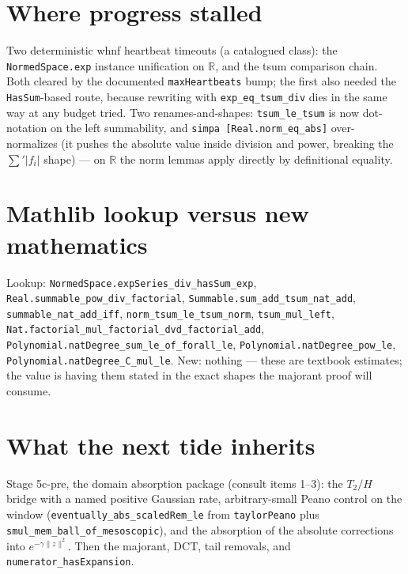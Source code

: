 \documentclass[11pt]{article}
\newcommand{\R}{\mathbb{R}}
\newcommand{\code}[1]{\texttt{#1}}
\begin{document}
\section{Where progress stalled}

Two deterministic whnf heartbeat timeouts (a catalogued class): the
\code{NormedSpace.exp} instance unification on $\R$, and the tsum
comparison chain. Both cleared by the documented
\code{maxHeartbeats} bump; the first also needed the
\code{HasSum}-based route, because rewriting with
\code{exp\_eq\_tsum\_div} dies in the same way at any budget tried.
Two renames-and-shapes: \code{tsum\_le\_tsum} is now dot-notation on
the left summability, and \code{simpa [Real.norm\_eq\_abs]}
over-normalizes (it pushes the absolute value inside division and
power, breaking the $\sum' |f_i|$ shape) --- on $\R$ the norm lemmas
apply directly by definitional equality.

\section{Mathlib lookup versus new mathematics}

\begin{sloppypar}
Lookup: \code{NormedSpace.expSeries\_div\_hasSum\_exp},
\code{Real.summable\_pow\_div\_factorial},
\code{Summable.sum\_add\_tsum\_nat\_add},
\code{summable\_nat\_add\_iff}, \code{norm\_tsum\_le\_tsum\_norm},
\code{tsum\_mul\_left},
\code{Nat.factorial\_mul\_factorial\_dvd\_factorial\_add},
\code{Polynomial.natDegree\_sum\_le\_of\_forall\_le},
\code{Polynomial.natDegree\_pow\_le},
\code{Polynomial.natDegree\_C\_mul\_le}. New: nothing --- these are
textbook estimates; the value is having them stated in the exact
shapes the majorant proof will consume.
\end{sloppypar}

\section{What the next tide inherits}

Stage 5c-pre, the domain absorption package (consult items 1--3):
the $T_2/H$ bridge with a named positive Gaussian rate,
arbitrary-small Peano control on the window
(\code{eventually\_abs\_scaledRem\_le} from \code{taylorPeano} plus
\code{smul\_mem\_ball\_of\_mesoscopic}), and the absorption of the
absolute corrections into $e^{-\gamma\|z\|^2}$. Then the majorant,
DCT, tail removals, and \code{numerator\_hasExpansion}.
\end{document}
